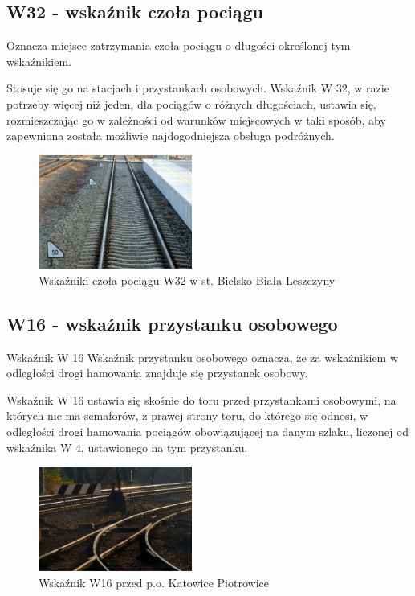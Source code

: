 \subsection{W32 - wskaźnik czoła pociągu}
\begin{tcolorbox}[colback=black!5!white,colframe=white!55!black,title=Wskaźnik W32]
Oznacza miejsce zatrzymania czoła pociągu o długości określonej tym wskaźnikiem.
\end{tcolorbox} Stosuje się go na stacjach i przystankach osobowych. Wskaźnik W 32, w razie potrzeby więcej niż jeden, dla pociągów o różnych długościach, ustawia się, rozmieszczając go w zależności od warunków miejscowych w taki sposób, aby zapewniona została możliwie
najdogodniejsza obsługa podróżnych.
	\begin{figure}
		\includegraphics[width=0.45\textwidth]{skryptkierownik-img/skryptkierownik-img007.jpg}
		\caption{Wskaźniki czoła pociągu W32 w st. Bielsko-Biała Leszczyny}
	\end{figure}

\subsection{W16 - wskaźnik przystanku osobowego}
\begin{tcolorbox}[colback=black!5!white,colframe=white!55!black,title=Wskaźnik W16]
Wskaźnik W 16 {\textquotedbl}Wskaźnik przystanku osobowego{\textquotedbl} oznacza, że za wskaźnikiem w odległości drogi hamowania znajduje się przystanek osobowy.
\end{tcolorbox} Wskaźnik W 16 ustawia się skośnie do toru przed przystankami osobowymi, na których nie ma semaforów, z prawej strony toru, do którego się odnosi, w odległości drogi hamowania pociągów obowiązującej na danym szlaku, liczonej od wskaźnika W 4, ustawionego na tym przystanku.
	\begin{figure}
		\includegraphics[width=0.45\textwidth]{skryptkierownik-img/skryptkierownik-img008.jpg}
		\caption{Wskaźnik W16 przed p.o. Katowice Piotrowice}
	\end{figure}

